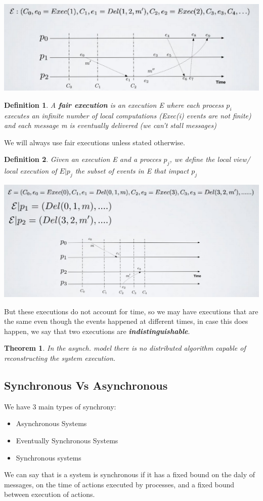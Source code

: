 \documentclass[11pt, a4paper]{article}
\newtheorem{thm}{Theorem}
\newtheorem{defn}{Definition}
\begin{document}
\begin{center}
    \includegraphics[scale=0.5]{img/execgraph.png}
\end{center}
\newpage
\begin{defn}
    A \textbf{fair execution} is an execution E where each process $p_i$ executes an infinite number of local computations (Exec(i) events are not finite) and each message m is eventually delivered (we can't stall messages)
\end{defn}
We will always use fair executions unless stated otherwise.
\begin{defn}
    Given an execution E and a procces $p_j$, we define the local view/ local execution of $E|p_j$ the subset of events in E that impact $p_j$
    \begin{center}
        \includegraphics[scale=0.5]{img/localexec.png}
    \end{center}
\end{defn}
But these executions do not account for time, so we may have executions that are the same even though the events happened at different times, in case this does happen, we say that two executions are \textbf{\textit{indistinguishable}}.
\begin{thm}
In the asynch. model there is no distributed algorithm capable of reconstructing the system execution.
\end{thm}

\subsection{Synchronous Vs Asynchronous}
We have 3 main types of synchrony:
\begin{itemize}
    \item Asynchronous Systems
    \item Eventually Synchronous Systems
    \item Synchronous systems
\end{itemize}
We can say that is a system is synchronous if it has a fixed bound on the daly of messages, on the time of actions executed by processes, and a fixed bound between execution of actions.
\end{document}

